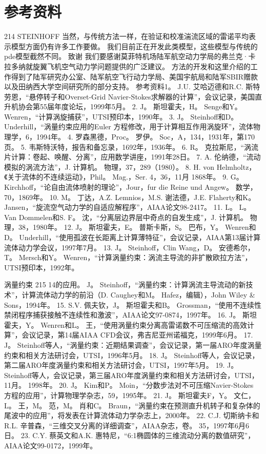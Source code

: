 \documentclass[UTF8,11pt,a4paper,openany,fontset=fandol]{ctexbook}
\begin{document}
\section{参考资料}
214 STEINHOFF 当然，与传统方法一样，在验证和校准湍流区域的雷诺平均表示模型方面仍有许多工作要做。 我们目前正在开发此类模型，这些模型与传统的pde模型截然不同。 致谢 我们要感谢莫菲特机场陆军航空动力学局的弗兰克·卡拉多纳就旋翼飞机空气动力学问题提供的广泛建议。 方法的开发和这里介绍的工作得到了陆军研究办公室、陆军航空飞行动力学局、美国宇航局和陆军SBIR赠款以及田纳西大学空间研究所的部分支持。 参考资料1。 J.U. 艾哈迈德和R.C. 斯特劳恩，“悬停转子和Overset-Grid Navier-Stokes求解器的计算”，会议记录，美国直升机协会第55届年度论坛，1999年5月。 2. J。 斯坦霍夫，H。 Senge和Y。 Wenren，“计算涡旋捕获”，UTSI预印本，1990年。 3. J。 Steinhoff和D。 Underhill，“涡量约束应用的Euler 方程修改，用于计算相互作用涡旋环”，流体物理学，6，1994年。 4. 罗森黑德，Proc。 罗伊。 Soc，A，134，1931年，第170页。 5. 韦斯特沃特，报告和备忘录，1692年，1936年。 6. R。 克拉斯尼，“涡流片计算：卷起、唤醒、分离”，应用数学讲座，1991年28日。 7. A. 伦纳德，“流动模拟的涡流方法”，J. 计算机。 物理，37，289（1980）。 8. H. von Helmholtz，《关于流体的不连续运动》，Phil。 Mag.，Ser. 4，36，11月 1868年。 9. G。 Kirchhoff，“论自由流体喷射的理论”，Jour，fur die Reine und Angew。 数学，70，1869年。 10. M。 丁达，A.Z. Lemnios，M.S. 谢法德，J.E. Flaherty和K。 Jansen，“旋流空气动力学的自适应解程序”，AIAA论文98-2417。 11. L。 L。 Van Dommelen和S. F。 沈，“分离层边界层中奇点的自发生成”，J. 计算机。 物理，38，1980年。 12. J。 斯坦霍夫，E。 普斯卡斯，S。 巴布，Y。 Wenren和D。 Underhill，“使用孤波在长距离上计算薄特征”，会议记录，AIAA第13届计算流体动力学会议，1997年7月。 13. J。 Steinhoff，Clin Wang，D。 安德希尔，T。 Mersch和Y。 Wenren，“计算涡量约束：涡流主导流的非扩散欧拉方法”，UTSI预印本，1992年。

涡量约束 215 14的应用。 J。 Steinhoff，“涡量约束：计算涡流主导流动的新技术”，计算流体动力学的前沿（D. Caughey和M。 Hafez，编辑），John Wiley \& Sons，1994年。 15. S.V. 佩夫钦，J。 斯坦霍夫和B。 Grossman，“使用不连续性禁闭程序捕获接触不连续性和激波”，AIAA论文97-0874，1997年。 16. J。 斯坦霍夫，Y。 Wenren和L。 王，“使用涡量约束分离高雷诺数不可压缩流的高效计算”，会议记录，第14届AIAA CFD会议，弗吉尼亚州诺福克，1999年6月。 17. J。 Steinhoff等人，“涡量约束：近期结果调查”，会议记录，第一届ARO年度涡量约束和相关方法研讨会，UTSI，1996年5月。 18. J。 Steinhoff等人，会议记录，第二届ARO年度涡量约束和相关方法研讨会，UTSI，1997年5月。 19. J。 Steinhoff等人，会议记录，第三届ARO年度涡量约束和相关方法研讨会，UTSI，11月。 1998年。 20. J。 Kim和P。 Moin，“分数步法对不可压缩Navier-Stokes 方程的应用”，计算物理学杂志，59，1995年。 21. J。 斯坦霍夫F，Y。 文仁，L。 王，M。 范，M。 肖和C。 Braun，“涡量约束在预测直升机转子和复杂体的尾波中的应用”，将发表在计算流体动力学杂志上，2000年。 22. C.J. 切斯纳卡和R.L. 辛普森，“三维交叉分离的详细调查”，AIAA杂志，卷。 35，1997年6月6日。 23. C.Y. 蔡英文和A.K. 惠特尼，“6:1椭圆体的三维流动分离的数值研究”，AIAA论文99-0172，1999年。
\end{document}
